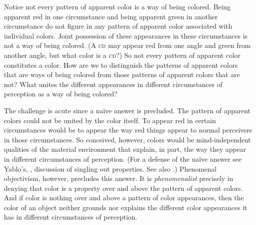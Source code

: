 \documentclass[12pt]{article}
\begin{document}
Notice not every pattern of apparent color is a way of being colored. Being apparent red in one circumstance and being apparent green in another circumstance do not figure in any pattern of apparent color associated with individual colors. Joint possession of these appearances in these circumstances is not a way of being colored. (A \textsc{cd} may appear red from one angle and green from another angle, but what color is a \textsc{cd}?) So not every pattern of apparent color constitutes a color. How are we to distinguish the patterns of apparent colors that are ways of being colored from those patterns of apparent colors that are not? What unites the different appearances in different circumstances of perception as a way of being colored?

The challenge is acute since a naïve answer is precluded. The pattern of apparent colors could not be united by the color itself. To appear red in certain circumstances would be to appear the way red things appear to normal perceivers in those circumstances. So conceived, however, colors would be mind-in\-de\-pen\-dent qualities of the material environment that explain, in part, the way they appear in different circumstances of perception. (For a defense of the naïve answer see Yablo's, \citeyear{Yablo:1995fk}, discussion of singling out properties. See also \citealp{Campbell:1997dq}.) Phenomenal objectivism, however, precludes this answer. It is \emph{phenomenalist} precisely in denying that color is a property over and above the pattern of apparent colors. And if color is nothing over and above a pattern of color appearances, then the color of an object neither grounds nor explains the different color appearances it has in different circumstances of perception.
\end{document}
